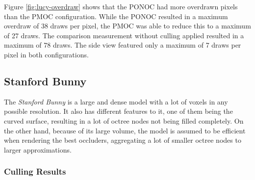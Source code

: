 \noindent
Figure \ref{fig:lucy-overdraw} shows that the \ac{PONOC} had more 
overdrawn pixels than the \ac{PMOC} configuration. While the 
\ac{PONOC} resulted in a maximum overdraw of 38 draws per pixel, 
the \ac{PMOC} was able to reduce this to a maximum of 27 draws.
The comparison measurement without culling applied resulted in a maximum of 78 draws. 
The side view featured only a maximum of 7 draws per pixel in both configurations.


\clearpage



\subsection*{Stanford Bunny}

The \emph{Stanford Bunny} is a large and dense model with a lot of voxels in any possible resolution.
It also has different features to it, one of them being the curved surface, resulting in a lot of octree 
nodes not being filled completely. On the other hand, because of its large volume, the model is assumed 
to be efficient when rendering the best occluders, aggregating a lot of smaller octree nodes to larger 
approximations.

\subsubsection*{Culling Results} \label{subsubsec-culling-results-bunny}


